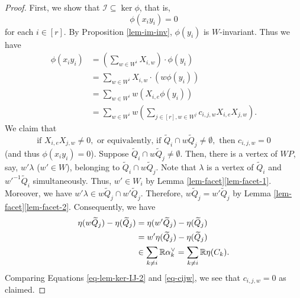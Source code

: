 \documentclass{amsart}
\theoremstyle{definition}
\theoremstyle{remark}
\numberwithin{equation}{section}
\begin{document}
\begin{proof}
    First, we show that $\mathcal{I} \subseteq \ker \phi$, that is, 
    \[\phi(x_i y_i) = 0\]
    for each $i \in [r]$.
    By Proposition \ref{lem-im-inv}, $\phi(y_i)$ is $W$-invariant.
    Thus we have 
    \begin{align*}
        \phi(x_i y_i) & = \left( \sum_{w \in W^i} X_{i,w}  \right) \cdot \phi(y_i) \\
        & = \sum_{w \in W^i} X_{i,w} \cdot \left( w \phi(y_i) \right) \\
        & = \sum_{w \in W^i} w \left( X_{i,e} \phi(y_i) \right) \\
        & = \sum_{w \in W^i} w \left( \sum_{j \in [r], w \in W^j} c_{i,j,w} X_{i,e} X_{j,w} \right).
    \end{align*}
    We claim that
    \begin{equation*} 
        \text{if } X_{i,e} X_{j,w} \ne 0, \text{ or equivalently, if } \widetilde{Q}_i \cap w \widetilde{Q}_j \ne \emptyset, \text{ then } c_{i,j,w} = 0
    \end{equation*}
    (and thus $\phi(x_i y_i) = 0$).
    Suppose $\widetilde{Q}_i \cap w \widetilde{Q}_j \ne \emptyset$.
    Then, there is a vertex of $\mathit{WP}$, say, $w' \lambda$ ($w' \in W$),  belonging to  $\widetilde{Q}_i \cap w \widetilde{Q}_j$.
    Note that $\lambda$ is a vertex of $\widetilde{Q}_i$ and $w'^{-1} \widetilde{Q}_i$ simultaneously. 
    Thus, $w' \in W_i$ by Lemma \ref{lem-facet}\eqref{lem-facet-1}.
    Moreover, we have $w' \lambda \in w \widetilde{Q}_j \cap w' \widetilde{Q}_j$.
    Therefore, $w \widetilde{Q}_j = w' \widetilde{Q}_j$ by Lemma \ref{lem-facet}\eqref{lem-facet-2}.
    Consequently, we have
    \begin{equation} \label{eq-lem-ker-IJ-2}
        \begin{split}
            \eta(w \widetilde{Q}_j) - \eta(\widetilde{Q}_j) & = \eta(w' \widetilde{Q}_j) - \eta(\widetilde{Q}_j) \\
            & = w' \eta(\widetilde{Q}_j) - \eta(\widetilde{Q}_j) \\
            & \in \sum_{k \ne i} \mathbb{R} \alpha_k\spcheck = \sum_{k \ne i} \mathbb{R} \eta(C_k).
        \end{split}
    \end{equation}
    Comparing Equations \eqref{eq-lem-ker-IJ-2} and  \eqref{eq-cijw}, we see that $c_{i,j,w} = 0$ as claimed.


\end{proof}
\end{document}
